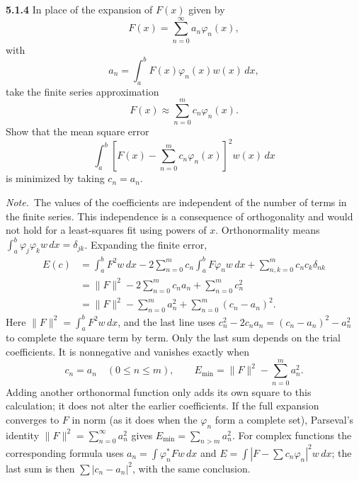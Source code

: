\par\bigskip
\noindent\textbf{5.1.4}\quad {}
In place of the expansion of $F(x)$ given by
\[
F(x)=\sum_{n=0}^{\infty}a_{n}\varphi_{n}(x),
\]
with
\[
a_{n}=\int_{a}^{b}F(x)\varphi_{n}(x)w(x)\,dx,
\]
take the finite series approximation
\[
F(x)\approx\sum_{n=0}^{m}c_{n}\varphi_{n}(x).
\]
Show that the mean square error
\[
\int_{a}^{b}\left[F(x)-\sum_{n=0}^{m}c_{n}\varphi_{n}(x)\right]^{2}w(x)\,dx
\]
is minimized by taking $c_{n}=a_{n}$.

\emph{Note.}~The values of the coefficients are independent of the number of
terms in the finite series. This independence is a consequence of
orthogonality and would not hold for a least-squares fit using powers of $x$.
\solution
{}
Orthonormality means $\int_a^b\varphi_j\varphi_k w\,dx=\delta_{jk}$.
Expanding the finite error,
\begin{align*}
E(c)&=\int_a^bF^2w\,dx
 -2\sum_{n=0}^m c_n\int_a^bF\varphi_nw\,dx
 +\sum_{n,k=0}^m c_nc_k\delta_{nk}\\
&=\|F\|^2-2\sum_{n=0}^m c_na_n+\sum_{n=0}^m c_n^2\\
&=\|F\|^2-\sum_{n=0}^m a_n^2+\sum_{n=0}^m(c_n-a_n)^2.
\end{align*}
Here $\|F\|^2=\int_a^bF^2w\,dx$, and the last line uses
$c_n^2-2c_na_n=(c_n-a_n)^2-a_n^2$ to complete the square term by term.
Only the last sum depends on the trial coefficients. It is nonnegative
and vanishes exactly when
\[
\boxed{c_n=a_n\quad(0\le n\le m)},\qquad
E_{\min}=\|F\|^2-\sum_{n=0}^m a_n^2.
\]
Adding another orthonormal function only adds its own square to this
calculation; it does not alter the earlier coefficients. If the full
expansion converges to $F$ in norm (as it does when the $\varphi_n$ form a
complete set), Parseval's identity
$\|F\|^2=\sum_{n=0}^\infty a_n^2$ gives $E_{\min}=\sum_{n>m}a_n^2$.
For complex functions the corresponding formula uses
$a_n=\int\varphi_n^*Fw\,dx$ and $E=\int|F-\sum c_n\varphi_n|^2w\,dx$;
the last sum is then $\sum|c_n-a_n|^2$, with the same conclusion.


